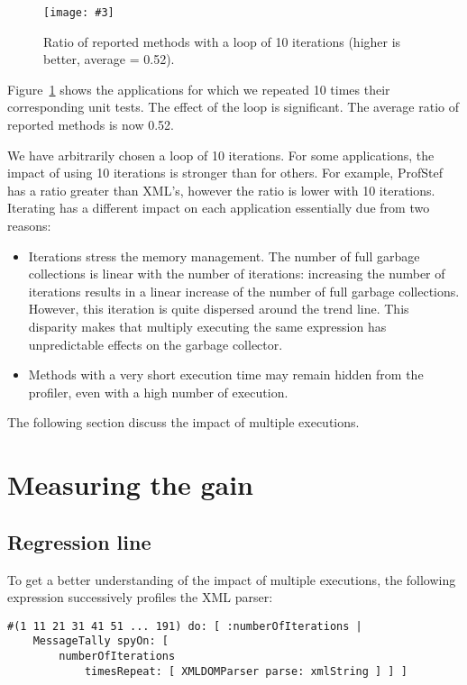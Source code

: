 \documentclass{sig-alternate}
\newcommand{\fig}[4]{
	\begin{figure}[#1]
		\centering
		\texttt{[image: \#3]}
		\caption{\label{fig:#3}#4}
	\end{figure}}
\newcommand{\seclabel}[1]{\label{sec:#1}}
\newcommand{\figref}[1]{Figure~\ref{fig:#1}}
\begin{document}
\fig{h}{0.5}{RatioAfter10Loops}{Ratio of reported methods with a loop of 10 iterations (higher is better, average = 0.52).}

\figref{RatioAfter10Loops} shows the applications for which we repeated 10 times their corresponding unit tests. The effect of the loop is significant. The average ratio of reported methods is now 0.52. 

We have arbitrarily chosen a loop of 10 iterations. For some applications, the impact of using 10 iterations is stronger than for others. For example, ProfStef has a ratio greater than XML's, however the ratio is lower with 10 iterations. Iterating has a different impact on each application essentially due from two reasons:

\begin{itemize}
\item Iterations stress the memory management. The number of full garbage collections is linear with the number of iterations: increasing the number of iterations results in a linear increase of the number of full garbage collections. However, this iteration is quite dispersed around the trend line. This disparity makes that multiply executing the same expression has unpredictable effects on the garbage collector.
\item Methods with a very short execution time may remain hidden from the profiler, even with a high number of execution.
\end{itemize}

The following section discuss the impact of multiple executions.

\section{Measuring the gain} \seclabel{measuringTheGain}
 
\subsection{Regression line}

To get a better understanding of the impact of multiple executions, the following expression successively profiles the XML parser:

\begin{lstlisting}
#(1 11 21 31 41 51 ... 191) do: [ :numberOfIterations |
	MessageTally spyOn: [  
		numberOfIterations 
			timesRepeat: [ XMLDOMParser parse: xmlString ] ] ]
\end{lstlisting}
\end{document}
